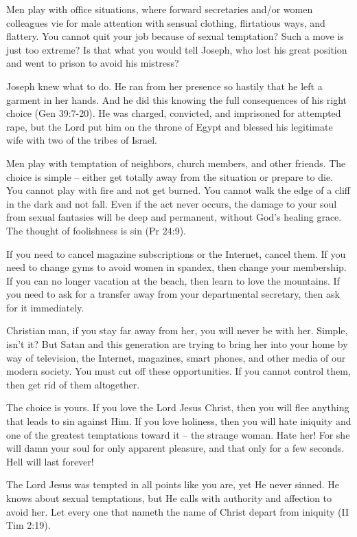 Men play with office situations, where forward secretaries and/or women colleagues vie for male attention with sensual clothing, flirtatious ways, and flattery. You cannot quit your job because of sexual temptation? Such a move is just too extreme? Is that what you would tell Joseph, who lost his great position and went to prison to avoid his mistress?

Joseph knew what to do. He ran from her presence so hastily that he left a garment in her hands. And he did this knowing the full consequences of his right choice (Gen 39:7-20). He was charged, convicted, and imprisoned for attempted rape, but the Lord put him on the throne of Egypt and blessed his legitimate wife with two of the tribes of Israel.

Men play with temptation of neighbors, church members, and other friends. The choice is simple – either get totally away from the situation or prepare to die. You cannot play with fire and not get burned. You cannot walk the edge of a cliff in the dark and not fall. Even if the act never occurs, the damage to your soul from sexual fantasies will be deep and permanent, without God’s healing grace. The thought of foolishness is sin (Pr 24:9).

If you need to cancel magazine subscriptions or the Internet, cancel them. If you need to change gyms to avoid women in spandex, then change your membership. If you can no longer vacation at the beach, then learn to love the mountains. If you need to ask for a transfer away from your departmental secretary, then ask for it immediately.

Christian man, if you stay far away from her, you will never be with her. Simple, isn’t it? But Satan and this generation are trying to bring her into your home by way of television, the Internet, magazines, smart phones, and other media of our modern society. You must cut off these opportunities. If you cannot control them, then get rid of them altogether.

The choice is yours. If you love the Lord Jesus Christ, then you will flee anything that leads to sin against Him. If you love holiness, then you will hate iniquity and one of the greatest temptations toward it – the strange woman. Hate her! For she will damn your soul for only apparent pleasure, and that only for a few seconds. Hell will last forever!

The Lord Jesus was tempted in all points like you are, yet He never sinned. He knows about sexual temptations, but He calls with authority and affection to avoid her. Let every one that nameth the name of Christ depart from iniquity (II Tim 2:19).

